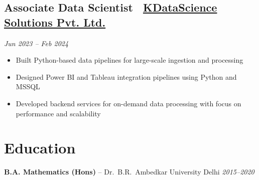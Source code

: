 \documentclass[10pt,a4paper]{article}
\newcommand{\job}[4]{%
  \subsection*{\textbf{#1} \textendash\ \href{#3}{#2}}%
  \textit{#4}\par\vspace{1pt}%
}
\begin{document}
\job{Associate Data Scientist}{KDataScience Solutions Pvt. Ltd.}{https://kdatascience.com/}{Jun 2023 -- Feb 2024}
\begin{itemize}
  \item Built Python-based data pipelines for large-scale ingestion and processing
  \item Designed Power BI and Tableau integration pipelines using Python and MSSQL
  \item Developed backend services for on-demand data processing with focus on performance and scalability
\end{itemize}

\section{Education}

\textbf{B.A. Mathematics (Hons)} -- Dr.\ B.R.\ Ambedkar University Delhi \hfill \textit{2015--2020}
\end{document}

